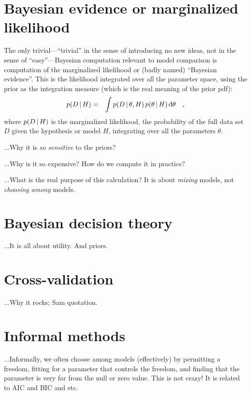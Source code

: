 \documentclass[12pt,twoside]{article}
\newcommand{\data}{D}
\newcommand{\pars}{\theta}
\begin{document}
\section{Bayesian evidence or marginalized likelihood}

The only trivial---``trivial'' in the sense of introducing no new
ideas, not in the sense of ``easy''---Bayesian computation
relevant to model comparison is computation of the marginalized
likelihood or (badly named) ``Bayesian evidence''.  This is the likelihood
integrated over all the parameter space, using the prior as the
integration measure (which is the real meaning of the prior
pdf):
\begin{eqnarray}
p(\data\given H) &=& \int p(\data\given\pars, H)\,p(\pars\given H)\,\dd\pars
\quad,
\end{eqnarray}
where $p(\data\given H)$ is the marginalized likelihood, the
probability of the full data set $\data$ given the hypothesis or model
$H$, integrating over all the parameters $\pars$.

...Why it is \emph{so sensitive} to the priors?

...Why is it so expensive?  How do we compute it in practice?

...What is the real purpose of this calculation?  It is about
\emph{mixing} models, not \emph{choosing among} models.

\section{Bayesian decision theory}

...It is all about utility.  And priors.

\section{Cross-validation}

...Why it rocks; Sam quotation.

\section{Informal methods}

...Informally, we often choose among models (effectively) by
permitting a freedom, fitting for a parameter that controls the
freedom, and finding that the parameter is very far from the null or
zero value.  This is not crazy!  It is related to AIC and BIC and etc.
\end{document}
